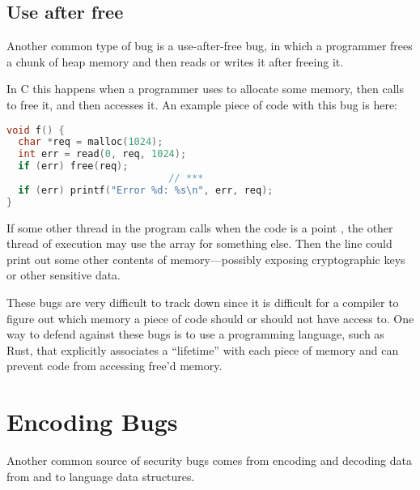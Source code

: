 \subsection{Use after free}
Another common type of bug is a use-after-free bug,
in which a programmer frees a chunk of heap memory and then
reads or writes it after freeing it.

In C this happens when a programmer uses  to allocate
some memory, then calls  to free it, and then accesses it.
An example piece of code with this bug is here:
\begin{lstlisting}[language=c]
void f() {
  char *req = malloc(1024);
  int err = read(0, req, 1024);
  if (err) free(req);
                            // ***
  if (err) printf("Error %d: %s\n", err, req);
}
\end{lstlisting}
If some other thread in the program calls  when
the code is a point \ttt{***}, the other thread of execution
may use the array  for something else.
Then the  line could print out some other contents
of memory---possibly exposing cryptographic keys or other
sensitive data.

These bugs are very difficult to track down since it is difficult
for a compiler to figure out which memory a piece of code should
or should not have access to.
One way to defend against these bugs is to use a programming language,
such as Rust, that explicitly associates a ``lifetime'' with each piece
of memory and can prevent code from accessing free'd memory.



\section{Encoding Bugs}
Another common source of security bugs comes from encoding and decoding data from and to language data structures.

